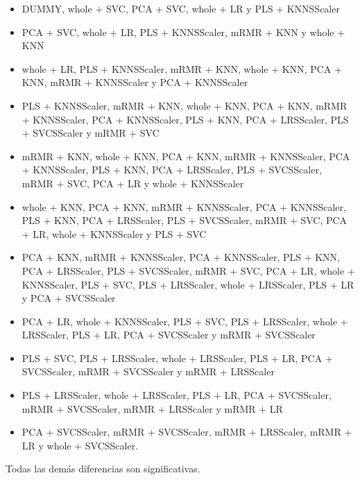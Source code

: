 \documentclass[a4paper,oneside,11pt,leqno]{article}
\begin{document}
	\begin{itemize}
		\item DUMMY, whole + SVC, PCA + SVC, whole + LR y PLS + KNNSScaler

		\item PCA + SVC, whole + LR, PLS + KNNSScaler, mRMR + KNN y whole + KNN

		\item whole + LR, PLS + KNNSScaler, mRMR + KNN, whole + KNN, PCA + KNN, mRMR + KNNSScaler y PCA + KNNSScaler

		\item PLS + KNNSScaler, mRMR + KNN, whole + KNN, PCA + KNN, mRMR + KNNSScaler, PCA + KNNSScaler, PLS + KNN, PCA + LRSScaler, PLS + SVCSScaler y mRMR + SVC

		\item mRMR + KNN, whole + KNN, PCA + KNN, mRMR + KNNSScaler, PCA + KNNSScaler, PLS + KNN, PCA + LRSScaler, PLS + SVCSScaler, mRMR + SVC, PCA + LR y whole + KNNSScaler

		\item whole + KNN, PCA + KNN, mRMR + KNNSScaler, PCA + KNNSScaler, PLS + KNN, PCA + LRSScaler, PLS + SVCSScaler, mRMR + SVC, PCA + LR, whole + KNNSScaler y PLS + SVC

		\item PCA + KNN, mRMR + KNNSScaler, PCA + KNNSScaler, PLS + KNN, PCA + LRSScaler, PLS + SVCSScaler, mRMR + SVC, PCA + LR, whole + KNNSScaler, PLS + SVC, PLS + LRSScaler, whole + LRSScaler, PLS + LR y PCA + SVCSScaler

		\item PCA + LR, whole + KNNSScaler, PLS + SVC, PLS + LRSScaler, whole + LRSScaler, PLS + LR, PCA + SVCSScaler y mRMR + SVCSScaler

		\item PLS + SVC, PLS + LRSScaler, whole + LRSScaler, PLS + LR, PCA + SVCSScaler, mRMR + SVCSScaler y mRMR + LRSScaler

		\item PLS + LRSScaler, whole + LRSScaler, PLS + LR, PCA + SVCSScaler, mRMR + SVCSScaler, mRMR + LRSScaler y mRMR + LR

		\item PCA + SVCSScaler, mRMR + SVCSScaler, mRMR + LRSScaler, mRMR + LR y whole + SVCSScaler.

	\end{itemize}

	Todas las demás diferencias son significativas.
\end{document}
